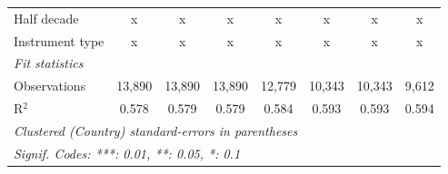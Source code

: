 \begin{tabular}{lccccccc}
   Half decade                                                                                  & x            & x            & x            & x            & x            & x            & x\\  
   Instrument type                                                                              & x            & x            & x            & x            & x            & x            & x\\  
   \midrule \emph{Fit statistics}\\
   Observations                                                                                 & 13,890       & 13,890       & 13,890       & 12,779       & 10,343       & 10,343       & 9,612\\  
   R$^2$                                                                                        & 0.578        & 0.579        & 0.579        & 0.584        & 0.593        & 0.593        & 0.594\\  
   \midrule
   \multicolumn{8}{l}{\emph{Clustered (Country) standard-errors in parentheses}}\\
   \multicolumn{8}{l}{\emph{Signif. Codes: ***: 0.01, **: 0.05, *: 0.1}}\\
\end{tabular}
\par\endgroup


